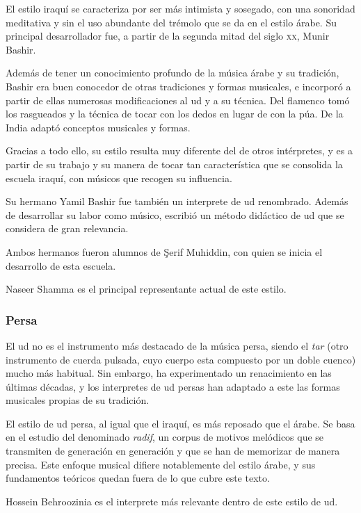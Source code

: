 El estilo iraquí se caracteriza por ser más intimista y sosegado, con una sonoridad meditativa y sin el uso abundante del trémolo que se da en el estilo árabe. Su principal desarrollador fue, a partir de la segunda mitad del siglo \textsc{xx}, Munir Bashir.

Además de tener un conocimiento profundo de la música árabe y su tradición, Bashir era buen conocedor de otras tradiciones y formas musicales, e incorporó a partir de ellas numerosas modificaciones al ud y a su técnica. Del flamenco tomó los rasgueados y la técnica de tocar con los dedos en lugar de con la púa. De la India adaptó conceptos musicales y formas.

Gracias a todo ello, su estilo resulta muy diferente del de otros intérpretes, y es a partir de su trabajo y su manera de tocar tan característica que se consolida la escuela iraquí, con músicos que recogen su influencia.

Su hermano Yamil Bashir fue también un interprete de ud renombrado. Además de desarrollar su labor como músico, escribió un método didáctico de ud que se considera de gran relevancia.

Ambos hermanos fueron alumnos de Şerif Muhiddin, con quien se inicia el desarrollo de esta escuela.

Naseer Shamma es el principal representante actual de este estilo.


\subsubsection{Persa}

El ud no es el instrumento más destacado de la música persa, siendo el \emph{tar} (otro instrumento de cuerda pulsada, cuyo cuerpo esta compuesto por un doble cuenco) mucho más habitual. Sin embargo, ha experimentado un renacimiento en las últimas décadas, y los interpretes de ud persas han adaptado a este las formas musicales propias de su tradición.

El estilo de ud persa, al igual que el iraquí, es más reposado que el árabe. Se basa en el estudio del denominado \emph{radif}, un corpus de motivos melódicos que se transmiten de generación en generación y que se han de memorizar de manera precisa. Este enfoque musical difiere notablemente del estilo árabe, y sus fundamentos teóricos quedan fuera de lo que cubre este texto.

Hossein Behroozinia es el interprete más relevante dentro de este estilo de ud.

